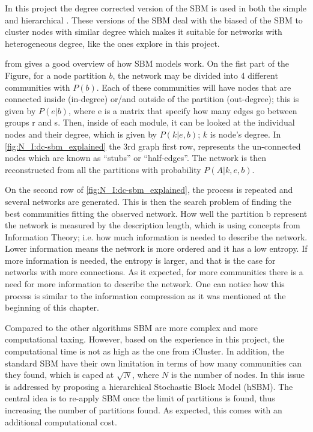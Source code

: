 In this project the degree corrected version of the SBM is used in both the simple and hierarchical \citet{Karrer2011-si, Peixoto2014-yb}. These versions of the SBM deal with the biased of the SBM to cluster nodes with similar degree which makes it suitable for networks with heterogeneous degree, like the ones explore in this project.


 from \citet{Peixoto2021-jx} gives a good overview of how SBM models work. On the fist part of the Figure, for a node partition $b$, the network may be divided into 4 different communities with $P(b)$. Each of these communities will have nodes that are connected inside (in-degree) or/and outside of the partition (out-degree); this is given by $P(e|b)$, where e is a matrix that specify how many edges go between groups r and s. Then, inside of each module, it can be looked at the individual nodes and their degree, which is given by $ P(k|e,b)$; $k$ is node's degree. In \cref{fig:N_I:dc-sbm_explained} the 3rd graph first row, represents the un-connected nodes which are known as “stubs” or “half-edges”. The network is then reconstructed from all the partitions with probability $P(A|k,e,b)$. 

On the second row of \cref{fig:N_I:dc-sbm_explained}, the process is repeated and several networks are generated. This is then the search problem of finding the best communities fitting the observed network. How well the partition b represent the network is measured by the description length, which is using concepts from Information Theory; i.e. how much information is needed to describe the network. Lower information means the network is more ordered and it has a low entropy. If more information is needed, the entropy is larger, and that is the case for networks with more connections. As it expected, for more communities there is a need for more information to describe the network. One can notice how this process is similar to the information compression as it was mentioned at the beginning of this chapter.

Compared to the other algorithms SBM are more complex and more computational taxing. However, based on the experience in this project, the computational time is not as high as the one from iCluster\citet{Mo2013-zi}. In addition, the standard SBM \citet{Peixoto2019-fg, Peixoto2017-gc, Peixoto2017-ua, Karrer2011-si} have their own limitation in terms of how many communities can they found, which is caped at $\sqrt{N}$, where $N$ is the number of nodes. In \citet{Peixoto2014-yb} this issue is addressed by proposing a hierarchical Stochastic Block Model (hSBM). The central idea is to re-apply SBM once the limit of partitions is found, thus increasing the number of partitions found. As expected, this comes with an additional computational cost.


